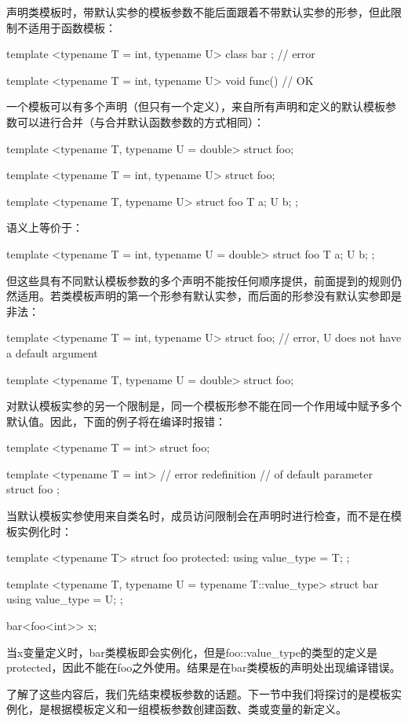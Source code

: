 声明类模板时，带默认实参的模板参数不能后面跟着不带默认实参的形参，但此限制不适用于函数模板：

\begin{cppcode}
template <typename T = int, typename U>
class bar { }; // error

template <typename T = int, typename U>
void func() {} // OK
\end{cppcode}

一个模板可以有多个声明（但只有一个定义），来自所有声明和定义的默认模板参数可以进行合并（与合并默认函数参数的方式相同）：

\begin{cppcode}
template <typename T, typename U = double>
struct foo;

template <typename T = int, typename U>
struct foo;

template <typename T, typename U>
struct foo
{
	T a;
	U b;
};
\end{cppcode}

语义上等价于：

\begin{cppcode}
template <typename T = int, typename U = double>
struct foo
{
	T a;
	U b;
};
\end{cppcode}

但这些具有不同默认模板参数的多个声明不能按任何顺序提供，前面提到的规则仍然适用。若类模板声明的第一个形参有默认实参，而后面的形参没有默认实参即是非法：

\begin{cppcode}
template <typename T = int, typename U>
struct foo; // error, U does not have a default argument

template <typename T, typename U = double>
struct foo;
\end{cppcode}

对默认模板实参的另一个限制是，同一个模板形参不能在同一个作用域中赋予多个默认值。因此，下面的例子将在编译时报错：

\begin{cppcode}
template <typename T = int>
struct foo;

template <typename T = int> // error redefinition
                            // of default parameter
struct foo {};
\end{cppcode}

当默认模板实参使用来自类名时，成员访问限制会在声明时进行检查，而不是在模板实例化时：

\begin{cppcode}
template <typename T>
struct foo
{
	protected:
	using value_type = T;
};

template <typename T, typename U = typename T::value_type>
struct bar
{
	using value_type = U;
};

bar<foo<int>> x;
\end{cppcode}

当x变量定义时，bar类模板即会实例化，但是foo::value_type的类型的定义是protected，因此不能在foo之外使用。结果是在bar类模板的声明处出现编译错误。

了解了这些内容后，我们先结束模板参数的话题。下一节中我们将探讨的是模板实例化，是根据模板定义和一组模板参数创建函数、类或变量的新定义。









